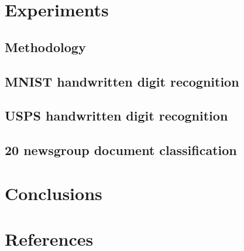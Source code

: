 \documentclass[review]{elsarticle}
\begin{document}
\section{Experiments}
\subsection{Methodology}
\subsection{MNIST handwritten digit recognition}
\subsection{USPS handwritten digit recognition}
\subsection{20 newsgroup document classification}
\section{Conclusions}

\section*{References}


\end{document}
